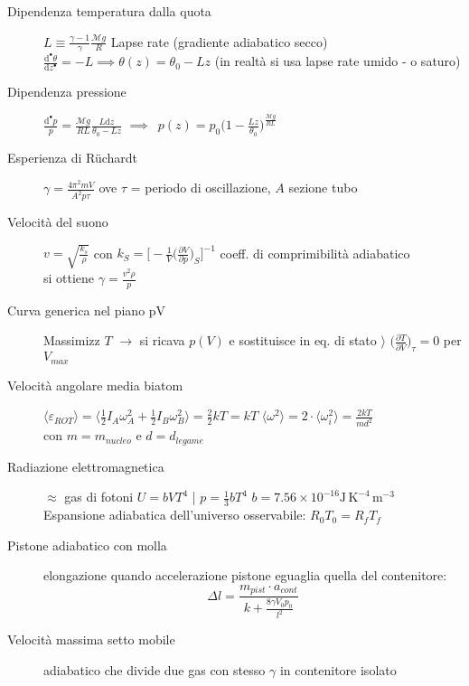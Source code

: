 \documentclass[10pt, oneside]{article}
\begin{document}
\begin{description}
\item[Dipendenza temperatura dalla quota] $\displaystyle L \equiv \frac{\gamma - 1}{\gamma} \frac{\mathcal{M} g}{R}$ Lapse rate (gradiente adiabatico secco) $\displaystyle \frac{\mathrm{d}^{•} \theta}{\mathrm{d}z^{•}} = -L \implies \theta(z) = \theta_0 - Lz$ (in realtà si usa lapse rate umido - o saturo)
\item[Dipendenza pressione]$\displaystyle \frac{\mathrm{d}^{•} p}{p} = \frac{\mathcal{M}g}{RL}\frac{L \mathrm{d}z}{\theta_0 - Lz}$ $\implies \enspace p(z) = p_0 \bigg(\displaystyle 1 - \frac{Lz}{\theta_0}\bigg)^{\displaystyle \frac{\mathcal{M}g}{RL}}$
\item[Esperienza di R\"uchardt] $\displaystyle \gamma = \frac{4 \pi^2 mV}{A^2 p \tau}$ ove $\tau$ = periodo di oscillazione, $A$ sezione tubo
\item[Velocità del suono]$\displaystyle v = \sqrt{\frac{k_s}{\rho}}$ con $\displaystyle k_S = \bigg[-\frac{1}{V} \bigg(\frac{\partial V}{\partial p}\bigg)_S\bigg]^{-1}$ coeff. di comprimibilità adiabatico
\\si ottiene $\boxed{\displaystyle \gamma = \frac{v^2 \rho}{p}}$
\item[Curva generica nel piano pV] Massimizz $T$ $\rightarrow$ si ricava $p(V)$ e sostituisce in eq. di stato $\rangle$ $\displaystyle \bigg(\frac{\partial T}{\partial V}\bigg)_\tau = 0$ per $V_{max}$
\item[Velocità angolare media biatom] $\displaystyle \langle \varepsilon_{ROT} \rangle = \langle \frac{1}{2} I_A \omega_A^2 + \frac{1}{2} I_B \omega_B^2 \rangle = \frac{2}{2} k T = k T$ \hfill \bigg\rangle \hfill $\displaystyle \langle \omega^2 \rangle = 2 \cdot \langle \omega_i^2 \rangle = \frac{2 k T}{m d^2}$ \\con $m = m_{nucleo}$ e $d = d_{legame}$
\item[Radiazione elettromagnetica] $\approx$ gas di fotoni \hfill \big\rangle \hfill $\displaystyle U = b V T^4$ \hfill \big| \hfill $\displaystyle p = \frac{1}{3} b  T^4$ \hfill \big\langle \hfill $\displaystyle b = 7.56 \times 10^{-16} \mathrm{J \, K^{-4} \, m^{-3}}$
\\Espansione adiabatica dell'universo osservabile: $\displaystyle R_0 T_0 = R_f T_f$
\item[Pistone adiabatico con molla] elongazione quando accelerazione pistone eguaglia quella del contenitore:
\[\Delta l = \frac{m_{pist} \cdot a_{cont}}{\displaystyle k + \frac{8 \gamma V_0 p_0}{l^2}}\]
\item[Velocità massima setto mobile] adiabatico che divide due gas con stesso $\gamma$ in contenitore isolato

\end{description}
\end{document}
